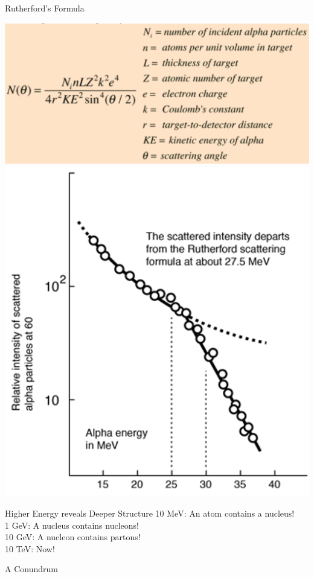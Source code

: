  \begin{frame}{Rutherford's Formula}
\small


\includegraphics[scale=0.4]{ruthform}
\includegraphics[scale=0.4]{ruthplot}

\end{frame}


 \begin{frame}{Higher Energy reveals Deeper Structure}
\small
10 MeV: An atom contains a nucleus!\\[3ex]

1 GeV: A nucleus contains nucleons! \\[3ex]

10 GeV: A nucleon contains partons! \\[3ex]

10 TeV: Now!\\[3ex]

\end{frame}


 \begin{frame}{A Conundrum}
\small




\end{frame}


